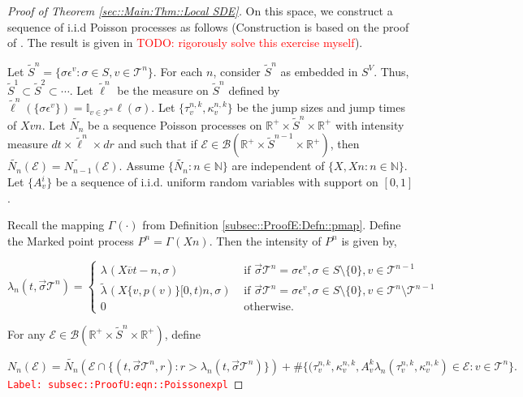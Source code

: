 \documentclass[12pt]{article}
\newcommand{\mb}{\mathbb}
\newcommand{\mc}{\mathcal}
\newcommand{\ms}{\mathscr}
\newcommand{\ov}{\overline}
\newcommand{\te}{\text}
\newcommand{\ep}{\epsilon}
\newcommand{\tr}{\textcolor{red}}
\newcommand{\labe}[1]{\tr{\texttt{Label: #1}}}
\newcommand{\ind}{\hspace{24pt}}
\renewcommand{\v}{v}							%
\renewcommand{\S}{S}							%
\newcommand{\s}{\sigma}							%
\newcommand{\sv}{\vec{\s}}						%
\newcommand{\ev}[1]{\ep^{#1}}					%
\renewcommand{\t}{t}							%
\newcommand{\X}{X}								%
\newcommand{\cl}{\ov}							%
\newcommand{\tree}{\mc{T}}						%
\newcommand{\sln}[1]{^{#1}}						%
\newcommand{\poiss}[1]{N_{#1}}						%
\renewcommand{\r}{r}								%
\newcommand{\rt}[1]{\tau^{#1}}						%
\renewcommand{\it}{k}								%
\newcommand{\itt}{i}								%
\newcommand{\XState}[1]{\S^{#1}}				%
\newcommand{\rp}[1]{P^{#1}}							%
\newcommand{\rate}[1]{\lambda_{#1}}					%
\newcommand{\crate}[2]{\alt{\lambda}_{#1}^{#2}}		%
\newcommand{\Sm}{\ell}								%
\newcommand{\alt}{\widetilde}						%
\newcommand{\rv}{A}								%
\newcommand{\evnt}{\mc{E}}						%
\renewcommand{\mark}[1]{\kappa^{#1}}				%
\newcommand{\p}[1]{p(#1)}						%
\newcommand{\pmap}[1]{\Gamma_{#1}}				%
\begin{document}
\begin{proof}[Proof of Theorem \ref{sec::Main:Thm::Local SDE}]
\ind On this space, we construct a sequence of i.i.d Poisson processes as follows (Construction is based on the proof of \cite[Theorem 14.7.1(b)]{DalVer08}. The result is given in \cite[Exercise 14.7.1]{DalVer08} \tr{TODO: rigorously solve this exercise myself}).

\ind Let \(\alt{\S}^n = \{\s\ev{\v}: \s\in\S,\v \in \tree\sln{n}\}\). For each \(n\), consider \(\alt{\S}^n\) as embedded in \(\S^ V\). Thus, \(\alt{\S}^1 \subset \alt{\S}^2 \subset \cdots\). Let \(\alt{\Sm}\sln{n}\) be the measure on \(\alt{\S}^n\) defined by \(\alt{\Sm}\sln{n}(\{\s\ev{\v}\}) = \mb{I}_{\v \in \tree\sln{n}}\Sm(\s)\). Let \(\{\rt{n,\it}_\v,\mark{n,\it}_{\v}\}\) be the jump sizes and jump times of \(\X{\v}{}{n}\). Let \(\alt{\poiss{n}}\) be a sequence Poisson processes on \(\mb{R}^+\times\alt{S}^n\times \mb{R}^+\) with intensity measure \(d\t\times\alt{\Sm}^n\times d\r\) and such that if \(\evnt \in \ms{B}(\mb{R}^+\times\alt{S}^{n-1}\times \mb{R}^+)\), then \(\alt{\poiss{n}}(\evnt) = \alt{\poiss{n-1}}(\evnt)\). Assume \(\{\alt{\poiss{n}}:n\in\mb{N}\}\) are independent of \(\{\X{}{},\X{}{}{n}:n\in\mb{N}\}\). Let \(\{\rv_{\v}^{\itt}\}\) be a sequence of i.i.d. uniform random variables with support on \([0,1]\).

\ind Recall the mapping \(\pmap{}(\cdot)\) from Definition \ref{subsec::ProofE:Defn::pmap}. Define the Marked point process \(\rp{n} = \pmap{}(\X{}{}{n})\). Then the intensity of \(\rp{n}\) is given by,

\[\rate{n}(\t,\sv{\tree\sln{n}}) = \begin{cases}
\rate{}(\X{\cl{\v}}{\t-}{n},\s) &\te{ if } \sv{\tree\sln{n}} = \s\ev{\v},\s \in \S\setminus\{0\},\v\in\tree\sln{n-1}\\
\crate{}{}(\X{\{\v,\p{\v}\}}{[0,\t)}{n},\s) &\te{ if } \sv{\tree\sln{n}} = \s\ev{\v},\s\in\S\setminus\{0\},\v\in\tree\sln{n}\setminus\tree\sln{n-1}\\
0 &\te{ otherwise.}
\end{cases}\]

For any \(\evnt \in \ms{B}(\mb{R}^+\times\alt{\S}^n\times\mb{R}^+)\), define

\begin{equation}
\poiss{n}(\evnt) = \alt{\poiss{n}}\left(\evnt\cap\{(t,\sv{\tree\sln{n}},\r):\r > \rate{n}(\t,\sv{\tree\sln{n}})\}\right) + \#\{(\rt{n,\it}_\v,\mark{n,\it}_\v,\rv_{\v}^{\it}\rate{n}(\rt{n,\it}_\v,\mark{n,\it}_\v) \in \evnt: \v\in \tree\sln{n}\}.
\label{subsec::ProofU:eqn::Poissonexpl}
\end{equation}
\labe{subsec::ProofU:eqn::Poissonexpl}


\end{proof}
\end{document}
